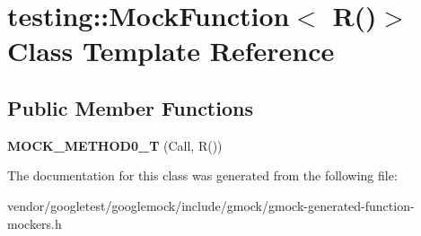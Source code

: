 \hypertarget{classtesting_1_1_mock_function_3_01_r_07_08_4}{}\section{testing\+:\+:Mock\+Function$<$ R()$>$ Class Template Reference}
\label{classtesting_1_1_mock_function_3_01_r_07_08_4}
\subsection*{Public Member Functions}
\begin{DoxyCompactItemize}
\item 
\mbox{\label{classtesting_1_1_mock_function_3_01_r_07_08_4_a08e7016e3e060a5cd375b66ff0cc04e8}} 
{\bfseries M\+O\+C\+K\+\_\+\+M\+E\+T\+H\+O\+D0\+\_\+T} (Call, R())
\end{DoxyCompactItemize}


The documentation for this class was generated from the following file\+:\begin{DoxyCompactItemize}
\item 
vendor/googletest/googlemock/include/gmock/gmock-\/generated-\/function-\/mockers.\+h\end{DoxyCompactItemize}

